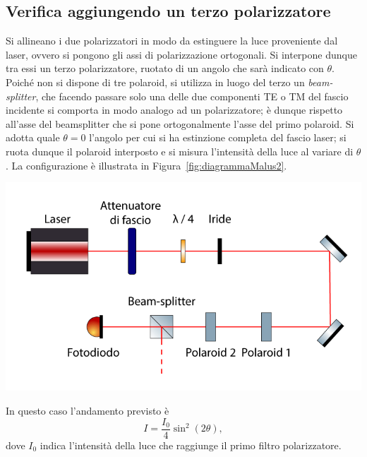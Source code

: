 \documentclass[10pt,oneside,a4paper]{article}
\newenvironment{Figure}
  {\par\medskip\noindent\minipage{\linewidth}}
  {\endminipage\par\medskip}
\begin{document}
\begin{multicols}{2}
\subsection{Verifica aggiungendo un terzo polarizzatore}

Si allineano i due polarizzatori in modo da estinguere la luce proveniente dal laser, ovvero si pongono gli assi di polarizzazione ortogonali. Si interpone dunque tra essi un terzo polarizzatore, ruotato di un angolo che sarà indicato con $\theta$. Poiché non si dispone di tre polaroid, si utilizza in luogo del terzo un \emph{beam-splitter}, che facendo passare solo una delle due componenti TE o TM del fascio incidente si comporta in modo analogo ad un polarizzatore; è dunque rispetto all'asse del beamsplitter che si pone ortogonalmente l'asse del primo polaroid. Si adotta quale $\theta = 0$ l'angolo per cui si ha estinzione completa del fascio laser; si ruota dunque il polaroid interposto e si misura l'intensità della luce al variare di $\theta$. La configurazione è illustrata in Figura~\ref{fig:diagrammaMalus2}.

\begin{Figure}
	\begin{center}
	\includegraphics[width=\linewidth]{malus2Diagram.png}
	\label{fig:diagrammaMalus2}
	\end{center}
\end{Figure}

In questo caso l'andamento previsto è
\begin{equation}\label{eq:Malus2}
I = \frac{I_0}{4}\sin^2(2\theta),
\end{equation}
dove $I_0$ indica l'intensità della luce che raggiunge il primo filtro polarizzatore.


\end{multicols}
\end{document}
